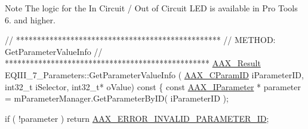 \begin{DoxyNote}{Note}
The logic for the In Circuit / Out of Circuit L\+E\+D is available in Pro Tools 6. and higher.
\end{DoxyNote}

\begin{DoxyCode}
\textcolor{comment}{// *************************************************}
\textcolor{comment}{// METHOD:  GetParameterValueInfo}
\textcolor{comment}{// *************************************************}
\hyperlink{a00149_a4d8f69a697df7f70c3a8e9b8ee130d2f}{AAX\_Result} EQIII\_7\_Parameters::GetParameterValueInfo ( \hyperlink{a00149_a1440c756fe5cb158b78193b2fc1780d1}{AAX\_CParamID} iParameterID, 
      int32\_t iSelector, int32\_t* oValue)\textcolor{keyword}{ const}
\textcolor{keyword}{}\{
    \textcolor{keyword}{const} \hyperlink{a00108}{AAX\_IParameter} * parameter = mParameterManager.GetParameterByID( iParameterID );
    
    \textcolor{keywordflow}{if} ( !parameter )
        \textcolor{keywordflow}{return} \hyperlink{a00207_a5f8c7439f3a706c4f8315a9609811937a06161017c1b18c4300e0634502e35b78}{AAX\_ERROR\_INVALID\_PARAMETER\_ID};
    

\end{DoxyCode}

